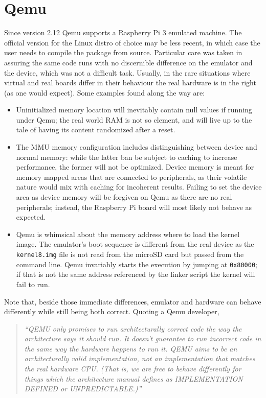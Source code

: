 \documentclass[12pt,a4paper,openright,twoside]{report}
\begin{document}
\section{Qemu}
Since version 2.12 Qemu supports a Raspberry Pi 3 emulated machine.
The official version for the Linux distro of choice may be less recent, in 
which case the user needs to compile the package from source.
 Particular care was taken in assuring the same code runs with no discernible difference on
the emulator and the device, which was not a difficult task.
Usually, in the rare situations where virtual and real boards differ in their
behaviour the real hardware is in the right (as one would expect).
Some examples found along the way are:
\begin{itemize}
    \item Uninitialized memory location will inevitably contain null values if 
        running under Qemu; the real world RAM is not so clement, and will live 
        up to the tale of having its content randomized after a reset.
    \item The MMU memory configuration includes distinguishing between device
        and normal memory: while the latter ban be subject to caching to increase performance,
        the former will not be optimized. Device memory is meant for memory mapped
        areas that are connected to peripherals, as their volatile nature would
        mix with caching for incoherent results.
        Failing to set the device area as device memory will be forgiven on Qemu
        as there are no real peripherals; instead, the Raspberry Pi board will most likely
        not behave as expected.
    \item Qemu is whimsical about the memory address where to load the kernel image.
        The emulator's boot sequence is different from the real device as the
        {\tt kernel8.img} file is not read from the microSD card but passed from
        the command line. Qemu invariably starts the execution by jumping at 
        {\tt 0x80000}; if that is not the same address referenced by the linker
        script the kernel will fail to run.
\end{itemize}

Note that, beside those immediate differences, emulator and hardware can behave
differently while still being both correct. Quoting a Qemu developer,

\begin{quote}
\textit{``QEMU only promises to run architecturally correct code the
way the architecture says it should run. It doesn't guarantee to
run incorrect code in the same way the hardware happens to run it.
QEMU aims to be an architecturally valid implementation, not
an implementation that matches the real hardware CPU. (That is, we are
free to behave differently for things which the architecture manual
defines as IMPLEMENTATION DEFINED or UNPREDICTABLE.)''}
\end{quote}
\end{document}
